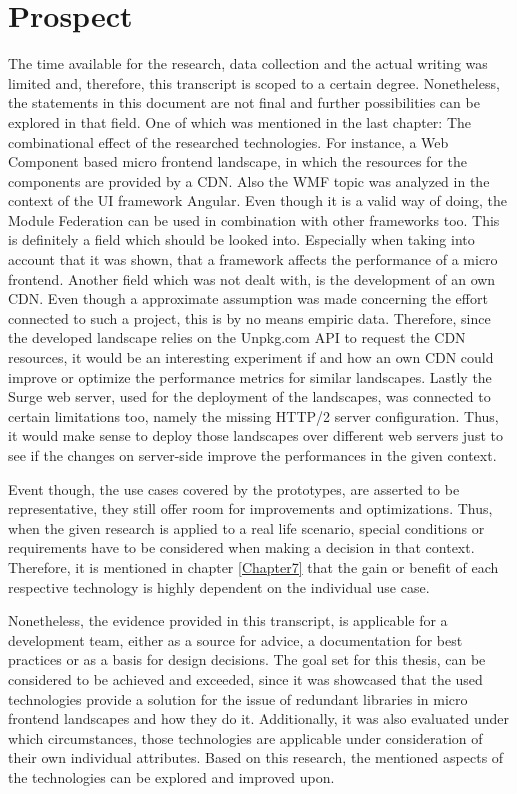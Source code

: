 \chapter{Prospect} %
\label{Chapter9}


The time available for the research, data collection and the actual writing was limited and, therefore, this transcript is scoped to a certain degree. Nonetheless, the statements in this document are not final and further possibilities can be explored in that field. One of which was mentioned in the last chapter: The combinational effect of the researched technologies. For instance, a Web Component based micro frontend landscape, in which the resources for the components are provided by a CDN. Also the WMF topic was analyzed in the context of the UI framework Angular. Even though it is a valid way of doing, the Module Federation can be used in combination with other frameworks too. This is definitely a field which should be looked into. Especially when taking into account that it was shown, that a framework affects the performance of a micro frontend. 
Another field which was not dealt with, is the development of an own CDN. Even though a approximate assumption was made concerning the effort connected to such a project, this is by no means empiric data. Therefore, since the developed landscape relies on the Unpkg.com API to request the CDN resources, it would be an interesting experiment if and how an own CDN could improve or optimize the performance metrics for similar landscapes.
Lastly the Surge web server, used for the deployment of the landscapes, was connected to certain limitations too, namely the missing HTTP/2 server configuration. Thus, it would make sense to deploy those landscapes over different web servers just to see if the changes on server-side improve the performances in the given context.

Event though, the use cases covered by the prototypes, are asserted to be representative, they still offer room for improvements and optimizations. Thus, when the given research is applied to a real life scenario, special conditions or requirements have to be considered when making a decision in that context. Therefore, it is mentioned in chapter \ref{Chapter7} that the gain or benefit of each respective technology is highly dependent on the individual use case. 

Nonetheless, the evidence provided in this transcript, is applicable for a development team, either as a source for advice, a documentation for best practices or as a basis for design decisions. The goal set for this thesis, can be considered to be achieved and exceeded, since it was showcased that the used technologies provide a solution for the issue of redundant libraries in micro frontend landscapes and how they do it. Additionally, it was also evaluated under which circumstances, those technologies are applicable under consideration of their own individual attributes. Based on this research, the mentioned aspects of the technologies can be explored and improved upon.




